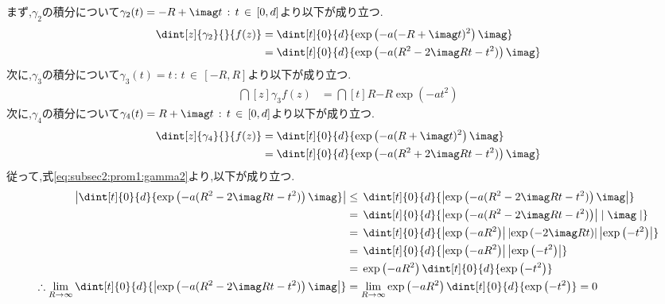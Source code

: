 \documentclass[dvipdfmx,titlepage, 11pt, a4paper]{jsarticle}%
\begin{document}
\begin{enumerate}[(1)]
    まず,$\gamma_2$の積分について$\gamma_2(t) = -R + \imag t\, : \, t\, \in \, \left[0, d\right]$より以下が成り立つ.
    \begin{align}
        \dint[z]{\gamma_2}{}{f(z)} 
        &= \dint[t]{0}{d}{\exp\left(-a(-R + \imag t)^2\right)\imag}\nonumber\\
        &= \dint[t]{0}{d}{\exp\left(-a(R^2 - 2\imag Rt - t^2)\right)\imag}\label{eq:subsec2:prom1:gamma2}
    \end{align}
    次に,$\gamma_3$の積分について$\gamma_3(t) = t\, : \, t\, \in \, \left[-R, R\right]$より以下が成り立つ.
    \begin{align}
        \dint[z]{\gamma_3}{}{f(z)} 
        &= \dint[t]{R}{-R}{\exp\left(-at^2\right)}\label{eq:subsec2:prom1:gamma3}
    \end{align}
    次に,$\gamma_4$の積分について$\gamma_4(t) = R + \imag t\, : \, t\, \in \, \left[0, d\right]$より以下が成り立つ.
    \begin{align}
        \dint[z]{\gamma_4}{}{f(z)} 
        &= \dint[t]{0}{d}{\exp\left(-a(R + \imag t)^2\right)\imag}\nonumber\\
        &= \dint[t]{0}{d}{\exp\left(-a(R^2 + 2\imag Rt - t^2)\right)\imag}\label{eq:subsec2:prom1:gamma4}
    \end{align}
    従って,式\eqref{eq:subsec2:prom1:gamma2}より,以下が成り立つ.
    \begin{align*}
        \left\lvert \dint[t]{0}{d}{\exp\left(-a(R^2 - 2\imag Rt - t^2)\right)\imag}\right\rvert
        &\leq \, \dint[t]{0}{d}{\left\lvert\exp\left(-a(R^2 - 2\imag Rt - t^2)\right)\imag\right\rvert}\\
        &= \, \dint[t]{0}{d}{\left\lvert\exp\left(-a(R^2 - 2\imag Rt - t^2)\right)\right\rvert\mid\imag\mid}\\
        &= \, \dint[t]{0}{d}{\left\lvert\exp\left(-aR^2\right)\right\rvert\left\lvert\exp\left(- 2\imag Rt\right)\right\rvert\left\lvert\exp\left(- t^2\right)\right\rvert}\\
        &= \, \dint[t]{0}{d}{\left\lvert\exp\left(-aR^2\right)\right\rvert\left\lvert\exp\left(- t^2\right)\right\rvert}\\
        &= \, \exp\left(-aR^2\right)\dint[t]{0}{d}{\exp\left(- t^2\right)}\\
        \therefore \lim_{R \to \infty} \dint[t]{0}{d}{\left\lvert\exp\left(-a(R^2 - 2\imag Rt - t^2)\right)\imag\right\rvert}
        &= \lim_{R \to \infty}\exp\left(-aR^2\right)\dint[t]{0}{d}{\exp\left(- t^2\right)} = 0
    \end{align*}

\end{enumerate}
\end{document}
